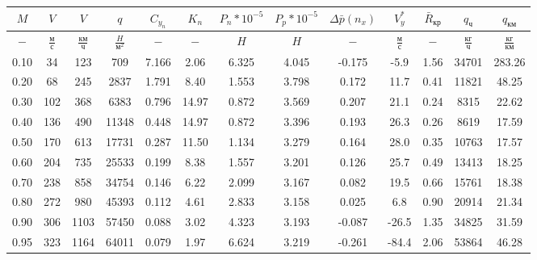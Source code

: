 \begin{tabular}{|c|c|c|c|c|c|c|c|c|c|c|c|c|}
\hline
$M$ & $V$ & $V$ & $q$ & $C_{y_n}$ & $K_n$ & $P_n*10^{-5}$ & $P_p*10^{-5}$ & $\Delta \bar{p}(n_x)$ & $V_y^*$ & $\bar{R}_{кр}$ & $q_{ч}$ & $q_{км}$ \\ 
\hline
$-$ & $\frac{м}{с}$ & $\frac{км}{ч}$ & $\frac{H}{м^2}$ & $-$ & $-$ & $H$ & $H$ & $-$ & $\frac{м}{с}$ & $-$ & $\frac{кг}{ч}$ & $\frac{кг}{км}$ \\ 
\hline
0.10 & 34 & 123 & 709 & 7.166 & 2.06 & 6.325 & 4.045 & -0.175 & -5.9 & 1.56 & 34701 & 283.26 \\ 
\hline
0.20 & 68 & 245 & 2837 & 1.791 & 8.40 & 1.553 & 3.798 & 0.172 & 11.7 & 0.41 & 11821 & 48.25 \\ 
\hline
0.30 & 102 & 368 & 6383 & 0.796 & 14.97 & 0.872 & 3.569 & 0.207 & 21.1 & 0.24 & 8315 & 22.62 \\ 
\hline
0.40 & 136 & 490 & 11348 & 0.448 & 14.97 & 0.872 & 3.396 & 0.193 & 26.3 & 0.26 & 8619 & 17.59 \\ 
\hline
0.50 & 170 & 613 & 17731 & 0.287 & 11.50 & 1.134 & 3.279 & 0.164 & 28.0 & 0.35 & 10763 & 17.57 \\ 
\hline
0.60 & 204 & 735 & 25533 & 0.199 & 8.38 & 1.557 & 3.201 & 0.126 & 25.7 & 0.49 & 13413 & 18.25 \\ 
\hline
0.70 & 238 & 858 & 34754 & 0.146 & 6.22 & 2.099 & 3.167 & 0.082 & 19.5 & 0.66 & 15761 & 18.38 \\ 
\hline
0.80 & 272 & 980 & 45393 & 0.112 & 4.61 & 2.833 & 3.158 & 0.025 & 6.8 & 0.90 & 20914 & 21.34 \\ 
\hline
0.90 & 306 & 1103 & 57450 & 0.088 & 3.02 & 4.323 & 3.193 & -0.087 & -26.5 & 1.35 & 34825 & 31.59 \\ 
\hline
0.95 & 323 & 1164 & 64011 & 0.079 & 1.97 & 6.624 & 3.219 & -0.261 & -84.4 & 2.06 & 53864 & 46.28 \\ 
\hline
\end{tabular}
